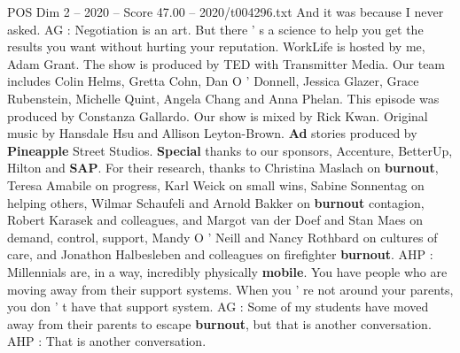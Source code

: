 \begin{textsample}{POS Dim 2 – 2020 – Score 47.00 – 2020/t004296.txt}
And it was because I never asked.
AG : Negotiation is an art.
But there ' s a science to help you get the results you want without hurting your reputation.
WorkLife is hosted by me, Adam Grant.
The show is produced by TED with Transmitter Media.
Our team includes Colin Helms, Gretta Cohn, Dan O ' Donnell, Jessica Glazer, Grace Rubenstein, Michelle Quint, Angela Chang and Anna Phelan.
This episode was produced by Constanza Gallardo.
Our show is mixed by Rick Kwan.
Original music by Hansdale Hsu and Allison Leyton-Brown. \textbf{Ad} stories produced by \textbf{Pineapple} Street Studios. \textbf{Special} thanks to our sponsors, Accenture, BetterUp, Hilton and \textbf{SAP}.
For their research, thanks to Christina Maslach on \textbf{burnout}, Teresa Amabile on progress, Karl Weick on small wins, Sabine Sonnentag on helping others, Wilmar Schaufeli and Arnold Bakker on \textbf{burnout} contagion, Robert Karasek and colleagues, and Margot van der Doef and Stan Maes on demand, control, support, Mandy O ' Neill and Nancy Rothbard on cultures of care, and Jonathon Halbesleben and colleagues on firefighter \textbf{burnout}.
AHP : Millennials are, in a way, incredibly physically \textbf{mobile}.
You have people who are moving away from their support systems.
When you ' re not around your parents, you don ' t have that support system.
AG : Some of my students have moved away from their parents to escape \textbf{burnout}, but that is another conversation.
AHP : That is another conversation.

\end{textsample}

